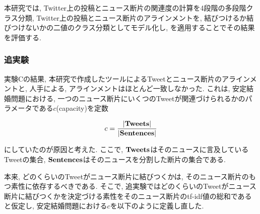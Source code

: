 \documentclass[12pt]{jarticle}
\begin{document}
本研究では, Twitter上の投稿とニュース断片の関連度の計算を4段階の多段階クラス分類, Twitter上の投稿とニュース断片のアラインメントを, 結びつけるか結びつけないかの二値のクラス分類としてモデル化し, \kappac を適用することでその結果を評価する. 




\subsubsection{追実験}
\label{additional_expr}

実験Cの結果, 本研究で作成したツールによるTweetとニュース断片のアラインメントと, 人手による, アラインメントはほとんど一致しなかった. これは, 安定結婚問題における, 一つのニュース断片にいくつのTweetが関連づけられるかのパラメータである$c$(capacity)を定数

\begin{equation}
  c = \frac{ |\bf{Tweets}| }{ |\bf{Sentences}| }
\end{equation}

にしていたのが原因と考えた. 
ここで, $\bf{Tweets}$はそのニュースに言及しているTweetの集合, $\bf{Sentences}$はそのニュースを分割した断片の集合である. 

本来, どのくらいのTweetがニュース断片に結びつくかは, そのニュース断片のもつ素性に依存するべきである. 
そこで, 追実験ではどのくらいのTweetがニュース断片に結びつくかを決定づける素性をそのニュース断片のtf-idf値の総和であると仮定し, 
安定結婚問題における$c$を以下のように定義し直した. 
\end{document}
